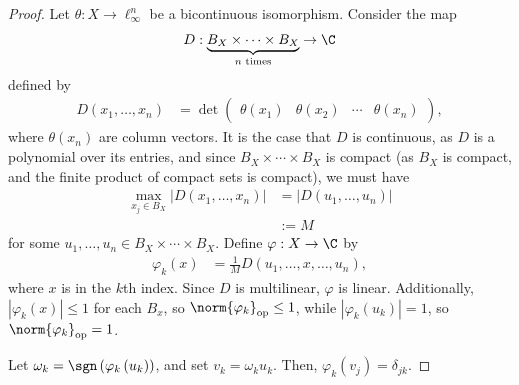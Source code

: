 \documentclass[10pt]{mypackage}
\begin{document}
\begin{proof}
  Let $\theta: X\rightarrow \ell_{\infty}^{n}$ be a bicontinuous isomorphism. Consider the map
  \begin{align*}
    D: \underbrace{B_{X}\times\cdots\times B_X}_{\text{$n$ times}}\rightarrow \C
  \end{align*}
  defined by
  \begin{align*}
    D\left(x_1,\dots,x_n\right) &= \det \begin{pmatrix}\theta\left(x_1\right) & \theta\left(x_2\right) & \cdots & \theta\left(x_n\right)\end{pmatrix},
  \end{align*}
  where $\theta\left(x_n\right)$ are column vectors. It is the case that $D$ is continuous, as $D$ is a polynomial over its entries, and since $B_X\times\cdots\times B_X$ is compact (as $B_X$ is compact, and the finite product of compact sets is compact), we must have
  \begin{align*}
    \max_{x_j\in B_X}\left\vert D\left(x_1,\dots,x_n\right) \right\vert &= \left\vert D\left(u_1,\dots,u_n\right) \right\vert\\
                                                                        &:= M
  \end{align*}
  for some $u_1,\dots,u_n\in B_X\times\cdots\times B_X$. Define $\varphi: X\rightarrow \C$ by
  \begin{align*}
    \varphi_k\left(x\right) &= \frac{1}{M}D\left(u_1,\dots,x,\dots,u_n\right),
  \end{align*}
  where $x$ is in the $k$th index. Since $D$ is multilinear, $\varphi$ is linear. Additionally, $\left\vert \varphi_k(x) \right\vert\leq 1$ for each $B_x$, so $\norm{\varphi_k}_{\text{op}} \leq 1$, while $\left\vert \varphi_k\left(u_k\right) \right\vert = 1$, so $\norm{\varphi_k}_{\text{op}} =1 $.\newline

  Let $\omega_k = \sgn\left(\varphi_k\left(u_k\right)\right)$, and set $v_k = \omega_ku_k$. Then, $\varphi_k\left(v_j\right) = \delta_{jk}$.\newline

  
\end{proof}
\end{document}
